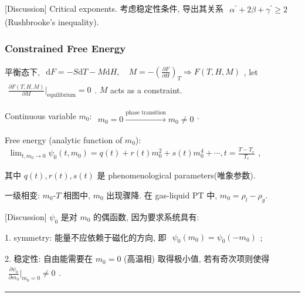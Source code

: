 \documentclass[../../main.tex]{subfiles}
\begin{document}
[Discussion] Critical exponents. 考虑稳定性条件, 导出其关系 $\begin{aligned}
    \alpha^{\prime} + 2\beta + \gamma^{\prime} \geq 2
\end{aligned}$ (Rushbrooke's inequality).

\subsubsection{Constrained Free Energy}
平衡态下, $\begin{aligned}
    \mathrm{d}F = -S\mathrm{d}T - M\mathrm{d}H,\quad M = -\left(\frac{\partial F}{\partial H}\right)_{T}\Rightarrow F(T,H,M)
\end{aligned}$, let $\begin{aligned}
    \frac{\partial F(T,H,M)}{\partial M}\bigg|_{\text{equilibrium}} = 0
\end{aligned}$. $M$ acts as a constraint.

Continuous variable $m_{0}$: $\begin{aligned}
    m_{0}=0\stackrel{\text{phase transition}}{\longrightarrow}m_{0}\neq 0
\end{aligned}$.  

Free energy (analytic function of $m_{0}$): $\begin{aligned}
    \lim_{t,m_{0}\rightarrow 0}\psi_{0}(t,m_{0}) = q(t) + r(t)m_{0}^{2} + s(t)m_{0}^{4}+\cdots,t = \frac{T-T_{c}}{T_{c}}
\end{aligned}$, 

其中 $q(t),r(t),s(t)$ 是 phenomenological parameters(唯象参数). 

一级相变: $m_{0}$-$T$ 相图中, $m_{0}$ 出现骤降. 在 gas-liquid PT 中, $m_{0} = \rho_{l}-\rho_{g}$. 

[Discussion] $\psi_{0}$ 是对 $m_{0}$ 的偶函数, 因为要求系统具有: 

1. symmetry: 能量不应依赖于磁化的方向, 即 $\begin{aligned}
    \psi_{0}(m_{0}) = \psi_{0}(-m_{0})
\end{aligned}$; 

2. 稳定性: 自由能需要在 $m_{0}=0$ (高温相) 取得极小值, 若有奇次项则使得 $\begin{aligned}
    \frac{\partial\psi_{0}}{\partial m_{0}}\bigg|_{m_{0}=0} \neq 0
\end{aligned}$. 

\vspace{0.5em}\hrule\vspace{0.5em}
\end{document}
